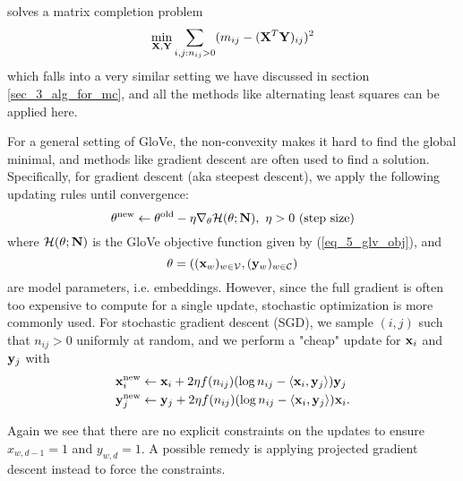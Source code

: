 \documentclass[../main.tex]{subfiles}
\begin{document}
solves a matrix completion problem
\begin{equation*}
\min_{\bf X,Y} \sum_{i,j:n_{ij}>0} (m_{ij}-({\bf X}^T{\bf Y})_{ij})^2
\end{equation*}
which falls into a very similar setting we have discussed in section \ref{sec_3_alg_for_mc}, and all the methods like alternating least squares can be applied here.
\par For a general setting of GloVe, the non-convexity makes it hard to find the global minimal, and methods like gradient descent are often used to find a solution. Specifically, for gradient descent (aka steepest descent), we apply the following updating rules until convergence:
\begin{equation*}
\theta^{\rm new}\leftarrow \theta^{\rm old}-\eta \nabla_{\theta}\mathcal{H}(\theta;{\bf N}),\ \eta>0\ (\text{step size})
\end{equation*}
where $\mathcal{H}(\theta;{\bf N})$ is the GloVe objective function given by (\ref{eq_5_glv_obj}), and 
\begin{equation*}
\theta=(({\bf x}_w)_{w\in \mathcal{V}},({\bf y}_w)_{w\in \mathcal{C}})
\end{equation*}
are model parameters, i.e. embeddings. However, since the full gradient is often too expensive to compute for a single update, stochastic optimization is more commonly used. For stochastic gradient descent (SGD), we sample $(i,j)$ such that $n_{ij}>0$ uniformly at random, and we perform a "cheap" update for ${\bf x}_i$ and ${\bf y}_j$ with
\begin{align*}
{\bf x}^{\rm new}_i &\leftarrow {\bf x}_i + 2\eta f(n_{ij})(\log n_{ij}-\langle {\bf x}_i,{\bf y}_j \rangle){\bf y}_j\\
{\bf y}^{\rm new}_j &\leftarrow {\bf y}_j + 2\eta f(n_{ij})(\log n_{ij}-\langle {\bf x}_i,{\bf y}_j \rangle){\bf x}_i.
\end{align*}
\begin{remark}
	Again we see that there are no explicit constraints on the updates to ensure $x_{w,d-1}=1$ and $y_{w,d}=1$. A possible remedy is applying projected gradient descent instead to force the constraints.
\end{remark}
\end{document}
